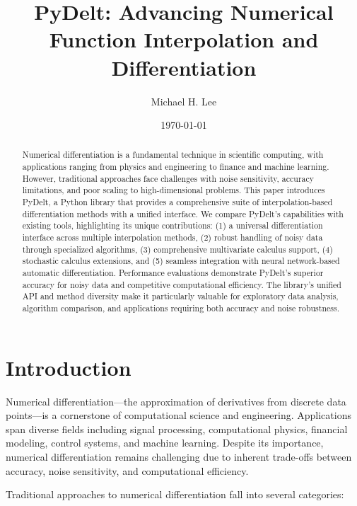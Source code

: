 \documentclass[11pt,a4paper]{article}
\title{PyDelt: Advancing Numerical Function Interpolation and Differentiation}
\author{Michael H. Lee}
\date{\today}
\begin{document}
\maketitle

\begin{abstract}
Numerical differentiation is a fundamental technique in scientific computing, with applications ranging from physics and engineering to finance and machine learning. However, traditional approaches face challenges with noise sensitivity, accuracy limitations, and poor scaling to high-dimensional problems. This paper introduces PyDelt, a Python library that provides a comprehensive suite of interpolation-based differentiation methods with a unified interface. We compare PyDelt's capabilities with existing tools, highlighting its unique contributions: (1) a universal differentiation interface across multiple interpolation methods, (2) robust handling of noisy data through specialized algorithms, (3) comprehensive multivariate calculus support, (4) stochastic calculus extensions, and (5) seamless integration with neural network-based automatic differentiation. Performance evaluations demonstrate PyDelt's superior accuracy for noisy data and competitive computational efficiency. The library's unified API and method diversity make it particularly valuable for exploratory data analysis, algorithm comparison, and applications requiring both accuracy and noise robustness.
\end{abstract}

\section{Introduction}

Numerical differentiation—the approximation of derivatives from discrete data points—is a cornerstone of computational science and engineering. Applications span diverse fields including signal processing, computational physics, financial modeling, control systems, and machine learning. Despite its importance, numerical differentiation remains challenging due to inherent trade-offs between accuracy, noise sensitivity, and computational efficiency.

Traditional approaches to numerical differentiation fall into several categories:
\end{document}
